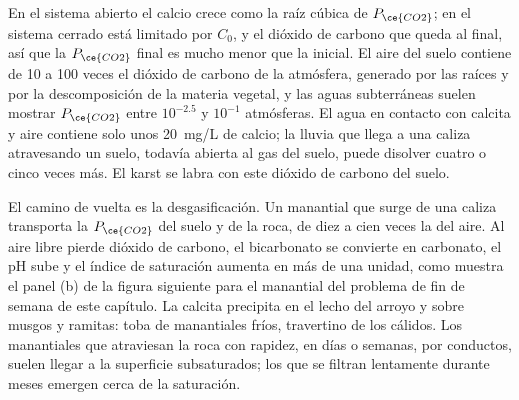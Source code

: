 En el sistema abierto el calcio crece como la raíz cúbica de $P_{\ce{CO2}}$; en
el sistema cerrado está limitado por $C_0$, y el dióxido de carbono que queda al
final, así que la $P_{\ce{CO2}}$ final es mucho menor que la inicial. El
aire del suelo contiene de 10 a 100 veces el dióxido de carbono de la atmósfera, generado por las raíces
y por la descomposición de la materia vegetal, y las aguas subterráneas suelen mostrar
$P_{\ce{CO2}}$ entre $10^{-2.5}$ y $10^{-1}$ atmósferas. El agua en contacto
con calcita y aire contiene solo unos \qty{20}{mg/L} de calcio; la lluvia que
llega a una caliza atravesando un suelo, todavía abierta al gas del suelo, puede disolver
cuatro o cinco veces más. El karst se labra con este dióxido de carbono del suelo.

El camino de vuelta es la desgasificación. Un manantial que surge de una caliza transporta
la $P_{\ce{CO2}}$ del suelo y de la roca, de diez a cien veces la del
aire. Al aire libre pierde dióxido de carbono, el bicarbonato se convierte en
carbonato, el pH sube y el índice de saturación aumenta en más de una unidad,
como muestra el panel (b) de la figura siguiente para el manantial del
problema de fin de semana de este capítulo.
La calcita precipita en el lecho del arroyo y sobre musgos y ramitas: toba de
manantiales fríos, travertino de los cálidos. Los manantiales que atraviesan la roca
con rapidez, en días o semanas, por conductos, suelen llegar a la superficie
subsaturados; los que se filtran lentamente durante meses emergen cerca de
la saturación.

